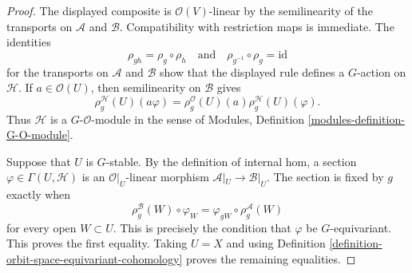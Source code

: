 \begin{proof}
The displayed composite is $\mathcal O(V)$-linear by the semilinearity of
the transports on $\mathcal A$ and $\mathcal B$. Compatibility with
restriction maps is immediate. The identities
$$
\rho_{gh}=\rho_g\circ\rho_h
\quad\text{and}\quad
\rho_{g^{-1}}\circ\rho_g=\text{id}
$$
for the transports on $\mathcal A$ and $\mathcal B$ show that the displayed
rule defines a $G$-action on $\mathcal H$. If $a\in\mathcal O(U)$, then
semilinearity on $\mathcal B$ gives
$$
\rho_g^{\mathcal H}(U)(a\varphi)=
\rho_g^{\mathcal O}(U)(a)\rho_g^{\mathcal H}(U)(\varphi).
$$
Thus $\mathcal H$ is a $G$-$\mathcal O$-module in the sense of Modules,
Definition \ref{modules-definition-G-O-module}.

Suppose that $U$ is $G$-stable. By the definition of internal hom, a section
$\varphi\in\Gamma(U,\mathcal H)$ is an $\mathcal O|_U$-linear morphism
$\mathcal A|_U\to\mathcal B|_U$. The section is fixed by $g$ exactly when
$$
\rho_g^{\mathcal B}(W)\circ\varphi_W=
\varphi_{gW}\circ\rho_g^{\mathcal A}(W)
$$
for every open $W\subset U$. This is precisely the condition that
$\varphi$ be $G$-equivariant. This proves the first equality. Taking
$U=X$ and using Definition
\ref{definition-orbit-space-equivariant-cohomology} proves the remaining
equalities.
\end{proof}


